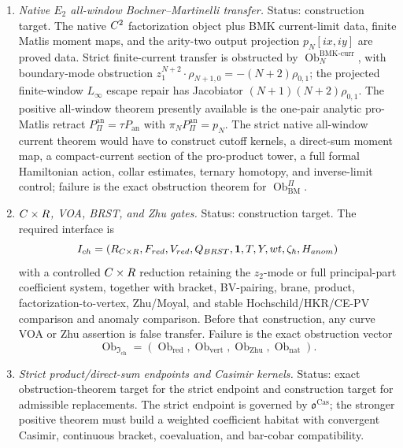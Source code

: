 \begin{enumerate}
  \item \emph{Native \(E_2\) all-window Bochner--Martinelli transfer.}
  Status: construction target.  The native \(C^2\) factorization object
  plus BMK current-limit data, finite Matlis moment maps, and the
  arity-two output projection \(p_N[ix,iy]\) are proved data.  Strict
  finite-current transfer is obstructed by
  \(\operatorname{Ob}^{\mathrm{BMK\mbox{-}curr}}_N\), with boundary-mode
  obstruction
  \(z_1^{N+2}\cdot\rho_{N+1,0}=-(N+2)\rho_{0,1}\); the projected finite-window
  \(L_\infty\) escape repair has Jacobiator
  \((N+1)(N+2)\rho_{0,1}\).  The positive all-window theorem presently
  available is the one-pair analytic pro-Matlis retract
  \(P_{\Pi}^{\mathrm{an}}=\tau P_{\mathrm{an}}\) with
  \(\pi_NP_{\Pi}^{\mathrm{an}}=p_N\).  The strict native all-window
  current theorem would have to construct cutoff kernels, a direct-sum
  moment map, a compact-current section of the pro-product tower, a full
  formal Hamiltonian action, collar estimates, ternary homotopy, and
  inverse-limit control; failure is the exact obstruction theorem for
  \(\operatorname{Ob}^{\Pi}_{\mathrm{BM}}\).

  \item \emph{\(C\times R\), VOA, BRST, and Zhu gates.}
  Status: construction target.  The required interface is
  \[
    I_{ch}
    =
    (R_{C\times R},F_{red},
     V_{red},Q_{BRST},\mathbf 1,T,Y,
     wt,\zeta_{\hbar},H_{anom})
  \]
  with a controlled \(C\times R\) reduction retaining the \(z_2\)-mode or
  full principal-part coefficient system, together with bracket,
  BV-pairing, brane, product, factorization-to-vertex, Zhu/Moyal, and
  stable Hochschild/HKR/CE-PV comparison and anomaly comparison.  Before
  that construction, any curve VOA or Zhu assertion is false transfer.
  Failure is the exact obstruction vector
  \[
    \operatorname{Ob}_{\mathfrak I_{\mathrm{ch}}}
    =
    (\operatorname{Ob}_{\mathrm{red}},
     \operatorname{Ob}_{\mathrm{vert}},
     \operatorname{Ob}_{\mathrm{Zhu}},
     \operatorname{Ob}_{\mathrm{nat}}).
  \]

  \item \emph{Strict product/direct-sum endpoints and Casimir kernels.}
  Status: exact obstruction-theorem target for the strict endpoint and
  construction target for admissible replacements.  The strict endpoint
  is governed by \(\mathfrak o^{\mathrm{Cas}}\); the stronger positive
  theorem must build a weighted coefficient habitat with convergent
  Casimir, continuous bracket, coevaluation, and bar-cobar compatibility.


\end{enumerate}
